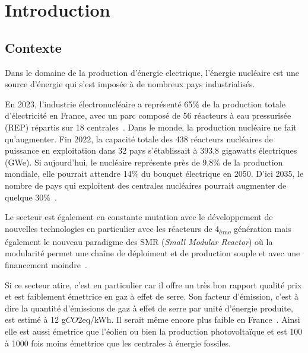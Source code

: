 
\chapter{Introduction}

\section*{Contexte}

Dans le domaine de la production d'énergie electrique, l'énergie nucléaire est une source d'énergie qui s'est imposée à de nombreux pays industrialisés.

En 2023, l'industrie électronucléaire a représenté 65\% de la production totale d'électricité en France, avec un parc composé de 56 réacteurs à eau pressurisée (REP) répartis sur 18 centrales~\cite{rte2023}. Dans le monde, la production nucléaire ne fait qu'augmenter. Fin 2022, la capacité totale des 438 réacteurs nucléaires de puissance en exploitation dans 32 pays s’établissait à 393,8 gigawatts électriques (GWe). Si aujourd'hui, le nucléaire représente près de 9,8\% de la production mondiale, elle pourrait attendre 14\% du bouquet électrique en 2050. D'ici 2035, le nombre de pays qui exploitent des centrales nucléaires pourrait augmenter de quelque 30\%~\cite{aiea2023}.

Le secteur est également en constante mutation avec le développement de nouvelles technologies en particulier avec les réacteurs de 4\textsubscript{ème} génération mais également le nouveau paradigme des SMR (\textit{Small Modular Reactor}) où la modularité permet une chaîne de déploiment et de production souple et avec une financement moindre~\cite{academie2022}.

Si ce secteur atire, c'est en particulier car il offre un très bon rapport qualité prix et est faiblement émettrice en gaz à effet de serre. Son facteur d'émission, c'est à dire la quantité d'émissions de gaz à effet de serre par unité d'énergie produite, est estimé à 12 g$CO2$eq/kWh. Il serait même encore plus faible en France~\cite{schlomer_technology-specific_nodate}. Ainsi elle est aussi émetrice que l'éolien ou bien la production photovoltaïque et est 100 à 1000 fois moins émettrice que les centrales à énergie fossiles.


